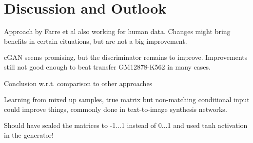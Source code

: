 \section{Discussion and Outlook}
Approach by Farre et al also working for human data.
Changes might bring benefits in certain cituations, but are not a big improvement.

cGAN seems promising, but the discriminator remains to improve.
Improvements still not good enough to beat transfer GM12878-K562 in many cases.

Conclusion w.r.t. comparison to other approaches

Learning from mixed up samples, true matrix but non-matching conditional input could improve things,
commonly done in text-to-image synthesis networks.

Should have scaled the matrices to -1...1 instead of 0...1 and used tanh activation in the generator!
